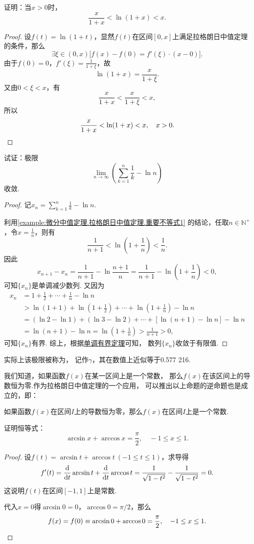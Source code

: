 \begin{example}\label{example:微分中值定理.拉格朗日中值定理.重要不等式1}
证明：当\(x>0\)时，\[
\frac{x}{1+x} < \ln(1+x) < x.
\]
\begin{proof}
设\(f(t) = \ln(1+t)\)，显然\(f(t)\)在区间\([0,x]\)上满足拉格朗日中值定理的条件，那么\[
\exists \xi\in(0,x) \bigl[
	f(x)-f(0)=f'(\xi)\cdot(x-0)
\bigr].
\]由于\(f(0)=0\)，\(f'(\xi)=\frac{1}{1+\xi}\)，故\[
\ln(1+x) = \frac{x}{1+\xi}.
\]又由\(0<\xi<x\)，有\[
\frac{x}{1+x}<\frac{x}{1+\xi}<x,
\]所以\[
\frac{x}{1+x}<\ln(1+x)<x, \quad x > 0.
\qedhere
\]
\end{proof}
\end{example}

\begin{example}
试证：极限\[
\lim\limits_{n\to\infty} \left(\sum\limits_{k=1}^n \frac{1}{k} - \ln n\right)
\]收敛.
\begin{proof}
记\(x_n = \sum\limits_{k=1}^n \frac{1}{k} - \ln n\).

利用\cref{example:微分中值定理.拉格朗日中值定理.重要不等式1} 的结论，任取\(n\in\mathbb{N}^+\)，令\(x=\frac{1}{n}\)，则有\[
\frac{1}{n+1} < \ln(1+\frac{1}{n}) < \frac{1}{n}.
\]因此\[
x_{n+1} - x_n = \frac{1}{n+1} - \ln\frac{n+1}{n}
= \frac{1}{n+1} - \ln(1+\frac{1}{n}) < 0,
\]可知\(\{x_n\}\)是单调减少数列.
又因为\begin{align*}
x_n &= 1 + \frac{1}{2} + \dotsb + \frac{1}{n} - \ln n \\
&> \ln(1+1) + \ln(1+\frac{1}{2}) + \dotsb + \ln(1+\frac{1}{n}) - \ln n \\
&= (\ln2-\ln1)+(\ln3-\ln2)+\dotsb+[\ln(n+1)-\ln n] - \ln n \\
&= \ln(n+1) - \ln n
= \ln(1+\frac{1}{n})
> \frac{1}{n+1} > 0,
\end{align*}
可知\(\{x_n\}\)有界.
综上，根据\hyperref[theorem:极限.函数的单调有界定理]{单调有界定理}可知，
数列\(\{x_n\}\)收敛于有限值.
\end{proof}
实际上该极限被称为，
记作\(\gamma\)，其在数值上近似等于0.577 216.
\end{example}

我们知道，如果函数\(f(x)\)在某一区间上是一个常数，
那么\(f(x)\)在该区间上的导数恒为零.作为拉格朗日中值定理的一个应用，
可以推出以上命题的逆命题也是成立的，即：
\begin{theorem}
如果函数\(f(x)\)在区间\(I\)上的导数恒为零，那么\(f(x)\)在区间\(I\)上是一个常数.
\end{theorem}

\begin{example}
证明恒等式：\[
\arcsin x + \arccos x = \frac{\pi}{2},
\quad -1 \leq x \leq 1.
\]
\begin{proof}
设\(f(t) = \arcsin t + \arccos t\ (-1 \leq t \leq 1)\)，求导得\[
	f'(t) = \dv{t} \arcsin t + \dv{t} \arccos t
	= \frac{1}{\sqrt{1-t^2}} - \frac{1}{\sqrt{1-t^2}} = 0.
\]
这说明\(f(t)\)在区间\([-1,1]\)上是常数.

代入\(x=0\)得\(\arcsin 0 = 0\)，\(\arccos 0 = \pi/2\)，那么\[
	f(x) = f(0) \equiv \arcsin 0 + \arccos 0 = \frac{\pi}{2},
	\quad -1 \leq x \leq 1.
	\qedhere
\]
\end{proof}
\end{example}

